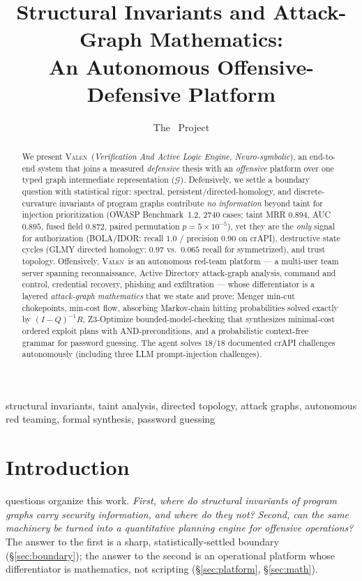 \documentclass[journal]{IEEEtran}
\title{Structural Invariants and Attack-Graph Mathematics:\\ An Autonomous Offensive-Defensive Platform}
\author{The \valen\ Project}
\newcommand{\valen}{\textsc{Valen}}
\newcommand{\IR}{\mathcal{G}}
\begin{document}
\maketitle

\begin{abstract}
We present \valen\ (\emph{Verification And Active Logic Engine, Neuro-symbolic}),
an end-to-end system that joins a measured \emph{defensive} thesis with an
\emph{offensive} platform over one typed graph intermediate representation
($\IR$). Defensively, we settle a boundary question with statistical rigor:
spectral, persistent/directed-homology, and discrete-curvature invariants of
program graphs contribute \emph{no information} beyond taint for injection
prioritization (OWASP Benchmark~1.2, $2740$ cases; taint MRR $0.894$, AUC $0.895$,
fused field $0.872$, paired permutation $p=5\times10^{-5}$), yet they are the
\emph{only} signal for authorization (BOLA/IDOR: recall $1.0$ / precision $0.90$
on crAPI), destructive state cycles (GLMY directed homology: $0.97$ vs.\ $0.065$
recall for symmetrized), and trust topology. Offensively, \valen\ is an autonomous
red-team platform --- a multi-user team server spanning reconnaissance, Active
Directory attack-graph analysis, command and control, credential recovery,
phishing and exfiltration --- whose differentiator is a layered
\emph{attack-graph mathematics} that we state and prove: Menger min-cut
chokepoints, min-cost flow, absorbing Markov-chain hitting probabilities solved
exactly by $(I-Q)^{-1}R$, Z3-Optimize bounded-model-checking that synthesizes
minimal-cost ordered exploit plans with AND-preconditions, and a probabilistic
context-free grammar for password guessing. The agent solves $18/18$ documented
crAPI challenges autonomously (including three LLM prompt-injection challenges).
\end{abstract}

\begin{IEEEkeywords}
structural invariants, taint analysis, directed topology, attack graphs,
autonomous red teaming, formal synthesis, password guessing
\end{IEEEkeywords}

\section{Introduction}
 questions organize this work. \emph{First, where do
structural invariants of program graphs carry security information, and where do
they not?} \emph{Second, can the same machinery be turned into a quantitative
planning engine for offensive operations?} The answer to the first is a sharp,
statistically-settled boundary (\S\ref{sec:boundary}); the answer to the second is
an operational platform whose differentiator is mathematics, not scripting
(\S\ref{sec:platform}, \S\ref{sec:math}).
\end{document}
